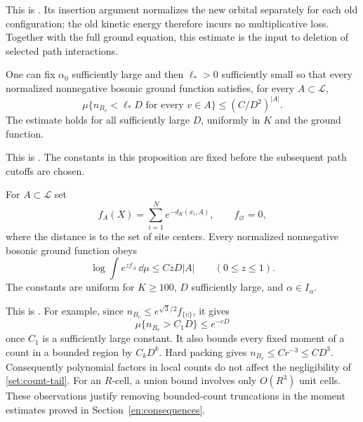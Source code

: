 This is \cite[Corollary 3.4 and Equation (3.9)]{H}. Its insertion
argument normalizes the new orbital separately for each old
configuration; the old kinetic energy therefore incurs no
multiplicative loss. Together with the full ground equation, this
estimate is the input to deletion of selected path interactions.

\begin{proposition}\label{set:low-counts}
One can fix $\alpha_0$ sufficiently large and then $\ell_*>0$
sufficiently small so that every normalized nonnegative bosonic ground
function satisfies, for every $A\subset\mathcal L$,
\begin{equation}\label{set:low-count-bound}
 \mu\{n_{B_v}<\ell_*D\text{ for every }v\in A\}
           \le (C/D^2)^{|A|}.
\end{equation}
The estimate holds for all sufficiently large $D$, uniformly in $K$
and the ground function.
\end{proposition}

This is \cite[Proposition 3.5 and Equation (3.10)]{H}. The constants in this
proposition are fixed before the subsequent path cutoffs are chosen.

\begin{proposition}\label{set:count-mgf}
For $A\subset\mathcal L$ set
\[
 f_A(X)=\sum_{i=1}^N e^{-d_K(x_i,A)},
 \qquad f_{\varnothing}=0,
\]
where the distance is to the set of site centers. Every normalized
nonnegative bosonic ground function obeys
\begin{equation}\label{set:count-mgf-bound}
 \log\int e^{z f_A}\,\dd\mu\le CzD|A|
               \qquad(0\le z\le1).
\end{equation}
The constants are uniform for $K\ge100$, $D$ sufficiently large, and
$\alpha\in I_\alpha$.
\end{proposition}

This is \cite[Proposition 3.7 and Equation (3.18)]{H}.
For example, since $n_{B_v}\le e^{\sqrt3/2}f_{\{v\}}$, it gives
\begin{equation}\label{set:count-tail}
 \mu\{n_{B_v}>C_1D\}\le e^{-cD}
\end{equation}
once $C_1$ is a sufficiently large constant. It also bounds every fixed
moment of a count in a bounded region by $C_kD^k$. Hard packing gives
$n_{B_v}\le C r^{-3}\le C D^3$. Consequently polynomial factors in
local counts do not affect the negligibility of \eqref{set:count-tail}.
For an $R$-cell, a union bound involves only $O(R^3)$ unit cells. These
observations justify removing bounded-count truncations in the moment
estimates proved in Section~\ref{en:consequences}.

